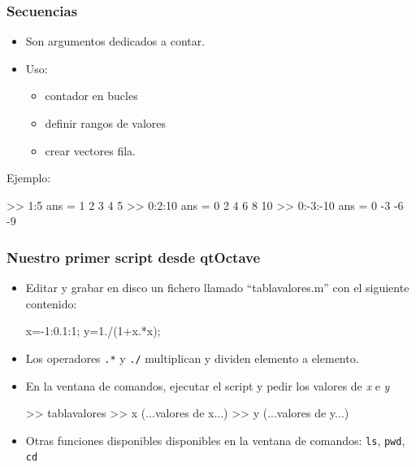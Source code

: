 
\hypertarget{secuencias}{}

\begin{frame}[containsverbatim]
\frametitle{Secuencias}
\small
\begin{itemize}
\item {} 
Son argumentos dedicados a contar.

\item {} 
Uso:
\begin{itemize}
\item contador en bucles
\item definir rangos de valores
\item crear vectores fila.
\end{itemize}

\end{itemize}

Ejemplo:
\begin{Octave}
  >> 1:5 
  ans =
    1 2 3 4 5
  >> 0:2:10
  ans =
    0 2 4 6 8 10
  >> 0:-3:-10
  ans =
    0 -3 -6 -9
\end{Octave}

\end{frame}


\begin{frame}[containsverbatim]
\frametitle{Nuestro primer script desde qtOctave}

\begin{itemize}

\item Editar y grabar en disco un fichero llamado
    ``tablavalores.m'' con el siguiente contenido:

\begin{Octave}[morekeywords={x,y}]
  x=-1:0.1:1; 
  y=1./(1+x.*x);
\end{Octave}

\item Los operadores \verb|.*| y \verb|./| multiplican y dividen
  elemento a elemento.

\item {} En la ventana de comandos, ejecutar el script y pedir los valores
  de \emph{x} e \emph{y}

\begin{Octave}[morekeywords={tablavalores,x,y}]
  >> tablavalores 
  >> x 
    (...valores de x...)  
  >> y
    (...valores de y...)
\end{Octave}


\item Otras funciones disponibles disponibles en la ventana de comandos:
  \texttt{ls}, \texttt{pwd}, \texttt{cd}
\end{itemize}





\end{frame}


